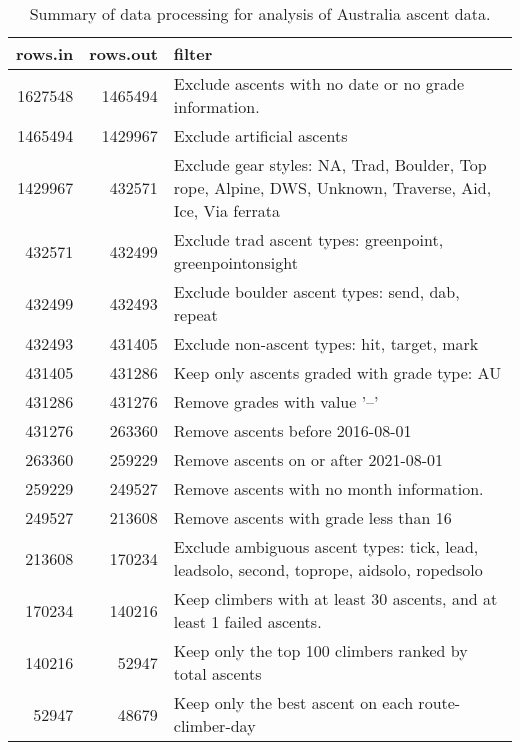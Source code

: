 \begin{table}[ht]
\centering
\begingroup\fontsize{9pt}{10pt}\selectfont
\begin{tabular}{rrl}
  \hline
{\bf rows.in} & {\bf rows.out} & {\bf filter} \\ 
  \hline
1627548 & 1465494 & Exclude ascents with no date or no grade information. \\ 
  1465494 & 1429967 & Exclude artificial ascents \\ 
  1429967 & 432571 & Exclude gear styles: NA, Trad, Boulder, Top rope, Alpine, DWS, Unknown, Traverse, Aid, Ice, Via ferrata \\ 
  432571 & 432499 & Exclude trad ascent types: greenpoint, greenpointonsight \\ 
  432499 & 432493 & Exclude boulder ascent types: send, dab, repeat \\ 
  432493 & 431405 & Exclude non-ascent types: hit, target, mark \\ 
  431405 & 431286 & Keep only ascents graded with grade type: AU \\ 
  431286 & 431276 & Remove grades with value '--' \\ 
  431276 & 263360 & Remove ascents before 2016-08-01 \\ 
  263360 & 259229 & Remove ascents on or after 2021-08-01 \\ 
  259229 & 249527 & Remove ascents with no month information. \\ 
  249527 & 213608 & Remove ascents with grade less than 16 \\ 
  213608 & 170234 & Exclude ambiguous ascent types: tick, lead, leadsolo, second, toprope, aidsolo, ropedsolo \\ 
  170234 & 140216 & Keep climbers with at least 30 ascents, and at least 1 failed ascents. \\ 
  140216 & 52947 & Keep only the top 100 climbers ranked by total ascents\\ 
  52947 & 48679 & Keep only the best ascent on each route-climber-day \\ 
   \hline
\end{tabular}
\endgroup
\caption{Summary of data processing for analysis of Australia ascent data.} 
\label{table-data-processing-aus}
\end{table}
